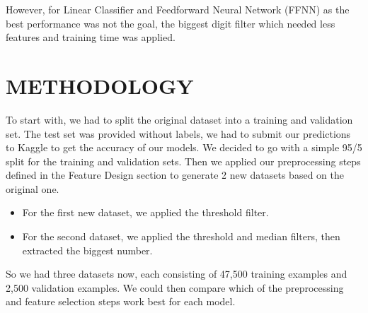 \documentclass[letterpaper, 10 pt, conference]{ieeeconf}  %
\begin{document}
However, for Linear Classifier and Feedforward Neural Network (FFNN) as the best performance was not the goal, the biggest digit filter which needed less features and training time was applied.


\section{METHODOLOGY}\label{sec:method}

To start with, we had to split the original dataset into a training and validation set. The test set was provided without labels, we had to submit our predictions to Kaggle to get the accuracy of our models. We decided to go with a simple 95/5 split for the training and validation sets. Then we applied our preprocessing steps defined in the Feature Design section to generate 2 new datasets based on the original one.

\begin{itemize}
\item For the first new dataset, we applied the threshold filter.
\item For the second dataset, we applied the threshold and median filters, then extracted the biggest number.
\end{itemize}

So we had three datasets now, each consisting of 47,500 training examples and 2,500 validation examples. We could then compare which of the preprocessing and feature selection steps work best for each model.
\end{document}
